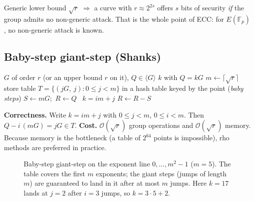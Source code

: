 \documentclass[11pt,a4paper,oneside]{book}
\theoremstyle{plain}
\theoremstyle{definition}
\theoremstyle{remark}
\newcommand{\F}{\mathbb{F}}
\newcommand{\bigO}{\mathcal{O}}
\begin{document}
\begin{keyidea}
Generic lower bound $\sqrt r$ $\Longrightarrow$ a curve with $r\approx2^{2s}$ offers $s$ bits of security \emph{if} the group admits no non-generic attack. That is the whole point of ECC: for $E(\F_p)$, no non-generic attack is known.
\end{keyidea}

\subsection{Baby-step giant-step (Shanks)}

\begin{algorithm}[ht]
\caption{Baby-step giant-step}\label{alg:bsgs}
\begin{algorithmic}[1]
\Require $G$ of order $r$ (or an upper bound $r$ on it), $Q\in\langle G\rangle$ \Ensure $k$ with $Q=kG$
\State $m\gets\lceil\sqrt r\rceil$
\State store table $T=\{(jG,\ j): 0\le j<m\}$ in a hash table keyed by the point (\emph{baby steps})
\State $S\gets mG$;\ $R\gets Q$
   \ \Return $k=im+j$\EndIf
   \State $R\gets R-S$
\EndFor
\end{algorithmic}
\end{algorithm}

\textbf{Correctness.} Write $k=im+j$ with $0\le j<m$, $0\le i<m$. Then $Q-i\,(mG)=jG\in T$.
\textbf{Cost.} $\bigO(\sqrt r)$ group operations and $\bigO(\sqrt r)$ memory. Because memory is the bottleneck (a table of $2^{64}$ points is impossible), rho methods are preferred in practice.

\begin{figure}[ht]
\centering
{}
\caption{Baby-step giant-step on the exponent line $0,\dots,m^2-1$ ($m=5$). The table covers the first $m$ exponents; the giant steps (jumps of length $m$) are guaranteed to land in it after at most $m$ jumps. Here $k=17$ lands at $j=2$ after $i=3$ jumps, so $k=3\cdot5+2$.}
\label{fig:bsgs}
\end{figure}
\end{document}
